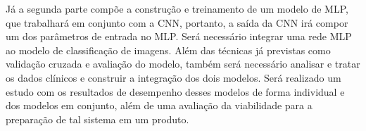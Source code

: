 Já a segunda parte compõe a construção e treinamento de um modelo de MLP, que trabalhará em conjunto com a CNN, portanto, a saída da CNN irá compor um dos parâmetros de entrada no MLP. Será necessário integrar uma rede MLP ao modelo de classificação de imagens. Além das técnicas já previstas como validação cruzada e avaliação do modelo, também será necessário analisar e tratar os dados clínicos e construir a integração dos dois modelos. Será realizado um estudo com os resultados de desempenho desses modelos de forma individual e dos modelos em conjunto, além de uma avaliação da viabilidade para a preparação de tal sistema em um produto.
%
%
%
%
%
%
%
%
